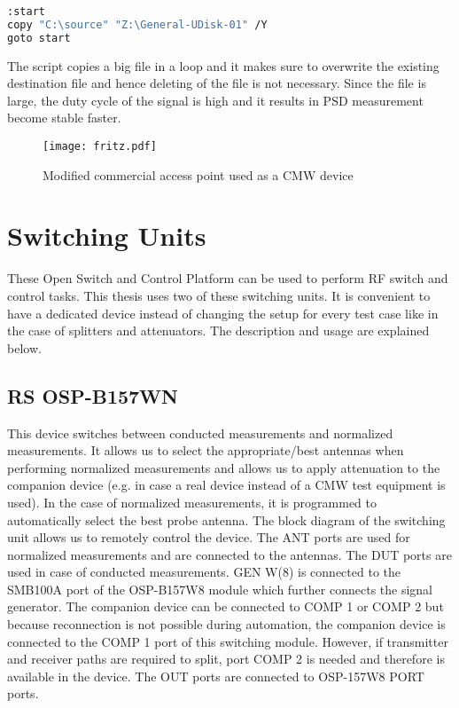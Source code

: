 \begin{lstlisting}[language=bash]
:start
copy "C:\source" "Z:\General-UDisk-01" /Y
goto start
\end{lstlisting}

The script copies a big file in a loop and it makes sure to overwrite the existing destination file and hence deleting of the file is not necessary. Since the file is large, the duty cycle of the signal is high and it results in \acf{PSD} measurement become stable faster. 

\begin{figure}[H]
\centering
\texttt{[image: fritz.pdf]}
\caption{Modified commercial access point used as a \acf{CMW} device}
\label{fig:cmwGUI}
\end{figure}

\section{Switching Units}
These Open Switch and Control Platform can be used to perform \acs{RF} switch and control tasks. This thesis uses two of these switching units. It is convenient to have a dedicated device instead of changing the setup for every test case like in the case of splitters and attenuators. The description and usage are explained below.

\subsection{\acs{RS}\textregistered{} \ac{OSP}-B157WN} \label{sec:wn}
This device switches between conducted measurements and normalized measurements. It allows us to select the appropriate/best antennas when performing normalized measurements and allows us to apply attenuation to the companion device (e.g. in case a real device instead of a \acs{CMW} test equipment is used). In the case of normalized measurements, it is programmed to automatically select the best probe antenna. The block diagram of the switching unit allows us to remotely control the device. The ANT ports are used for normalized measurements and are connected to the antennas. The \acs{DUT} ports are used in case of conducted measurements. GEN W(8) is connected to the SMB100A port of the \acs{OSP}-B157W8 module which further connects the signal generator. The companion device can be connected to COMP 1 or COMP 2 but because reconnection is not possible during automation, the companion device is connected to the COMP 1 port of this switching module. However, if transmitter and receiver paths are required to split, port COMP 2 is needed and therefore is available in the device.
The OUT ports are connected to \acs{OSP}-157W8 PORT ports.

